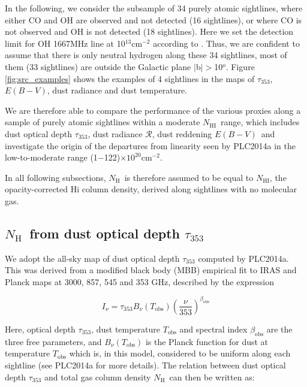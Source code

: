 \documentclass[preprint]{emulateapj}
\def\ebv{$E(B{-}V)$}
\def\NHI{$N_\mathrm{HI}$}
\def\NH{$N_\mathrm{H}$}
\def\t353{$\tau_{353}$}
\def\rad{$\mathcal{R}$}
\begin{document}
In the following, we consider the subsample of 34 purely atomic sightlines, where either CO and OH are observed and not detected (16 sightlines), or where CO is not observed and OH is not detected (18 sightlines). Here we set the detection limit for OH 1667MHz line at 10$^{13}$cm$^{-2}$ according to \citet{Li2017}.
Thus, we are confident to assume that there is only neutral hydrogen along these 34 sightlines, most of them (33 sightlines) are outside the Galactic plane $|$b$|$$>$10$^{o}$. Figure \ref{fig:src_examples} shows the examples of 4 sightlines in the maps of \t353, \ebv, dust radiance and dust temperature. %

We are therefore able to compare the performance of the various proxies along a sample of purely atomic sightlines within a moderate \NHI\ range, which includes dust optical depth \t353, dust radiance \rad, dust reddening \ebv\ and investigate the origin of the departures from linearity seen by PLC2014a in the low-to-moderate range (1$-$122)$\times10^{20}$cm$^{-2}$.

In all following subsections, \NH\ is therefore assumed to be equal to \NHI, the opacity-corrected H{\sc i} column density, derived along sightlines with no molecular gas.

\subsection{ \NH\ from dust optical depth \t353}
\label{subsec:nh-from-t353}
We adopt the all-sky map of dust optical depth \t353 computed by PLC2014a. This was derived from a modified black body (MBB) empirical fit to IRAS and Planck maps at 3000, 857, 545 and 353 GHz, described by the expression %

\begin{equation}
I_{\nu} = \tau_{353}B_{\nu}(T_\mathrm{obs})\left(\frac{\nu}{353}\right)^{\beta_\mathrm{obs}}
\label{eq_mbbfit}
\end{equation}

\noindent Here, optical depth \t353, dust temperature $T_\mathrm{obs}$ and spectral index $\beta_\mathrm{obs}$ are the three free parameters, and $B_{\nu}(T_\mathrm{obs})$ is the Planck function for dust at temperature $T_\mathrm{obs}$ which is, in this model, considered to be uniform along each sightline (see PLC2014a for more details).
The relation between dust optical depth \t353 and total gas column density \NH\ can then be written as:
\end{document}
